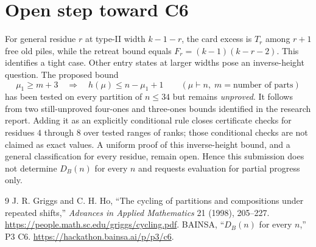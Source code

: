 \documentclass[11pt]{article}
\newcommand{\DB}{D_B}
\newcommand{\Tr}{T}
\begin{document}
\section{Open step toward C6}
For general residue $r$ at type-II width $k-1-r$, the card excess is
$\Tr_r$ among $r+1$ free old piles, while the retreat bound equals
$F_r=(k-1)(k-r-2)$.  This identifies a tight case.  Other entry states
at larger widths pose an inverse-height question.  The proposed bound
\[
 \mu_1\geq m+3\quad\Longrightarrow\quad h(\mu)\leq n-\mu_1+1
 \qquad(\mu\vdash n,\;m=\text{number of parts})
\]
has been tested on every partition of $n\leq34$ but remains \emph{unproved}.
It follows from two still-unproved four-ones and three-ones bounds identified
in the research report.  Adding it as an explicitly conditional rule closes
certificate checks for residues $4$ through $8$ over tested ranges of ranks;
those conditional checks are not claimed as exact values.  A uniform proof
of this inverse-height bound, and a general classification for every residue,
remain open.  Hence this submission does not determine $\DB(n)$ for every
$n$ and requests evaluation for partial progress only.

\begin{thebibliography}{9}
 J. R. Griggs and C. H. Ho, ``The cycling of partitions and
compositions under repeated shifts,'' \emph{Advances in Applied Mathematics}
21 (1998), 205--227. \url{https://people.math.sc.edu/griggs/cycling.pdf}.
 BAINSA, ``$D_B(n)$ for every $n$,'' P3 C6.
\url{https://hackathon.bainsa.ai/p/p3/c6}.
\end{thebibliography}
\end{document}
